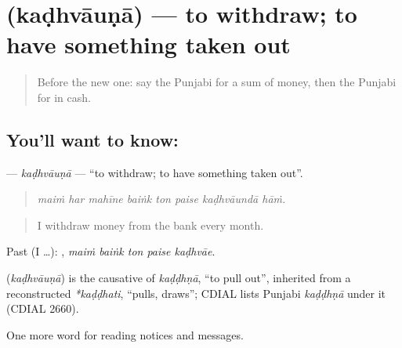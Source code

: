 \section[\texorpdfstring{\pa{ਕਢਵਾਉਣਾ} (kaḍhvāuṇā)}{ਕਢਵਾਉਣਾ (kaḍhvāuṇā)}]{ (kaḍhvāuṇā) — to withdraw; to have something taken out}

\label{lesson:PA-C257-kadhvauna}



\begin{quote}
Before the new one: say the Punjabi for a sum of money, then the Punjabi for in cash.
\end{quote}

\subsection*{You'll want to know: }
\textbf{} — \emph{kaḍhvāuṇā} — \textquotedblleft{}to withdraw; to have something taken out\textquotedblright{}.

\begin{quote}
       
\end{quote}

\begin{quote}
\emph{maiṁ har mahīne baiṅk ton paise kaḍhvāundā hāṁ.}
\end{quote}

\begin{quote}
I withdraw money from the bank every month.
\end{quote}

Past (I …):     , \emph{maiṁ baiṅk ton paise kaḍhvāe}.

\begin{cousinweb}
\textbf{} (\emph{kaḍhvāuṇā}) is the causative of \emph{kaḍḍhṇā}, \textquotedblleft{}to pull out\textquotedblright{}, inherited from a reconstructed \emph{*kaḍḍhati}, \textquotedblleft{}pulls, draws\textquotedblright{}; CDIAL lists Punjabi \emph{kaḍḍhṇā} under it (CDIAL 2660).
\end{cousinweb}

\begin{grammarlens}[title={What you've built}]
One more word for reading notices and messages.
\end{grammarlens}

